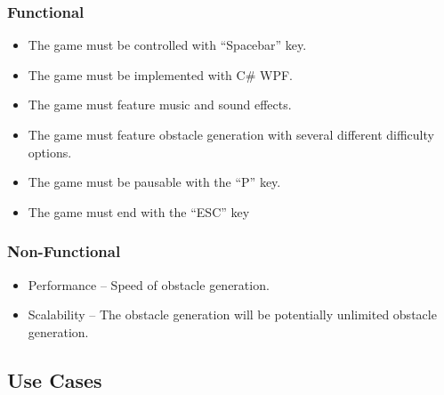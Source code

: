 \documentclass[10pt,conference,onecolumn,compsoc]{IEEEtran}
\begin{document}
\subsubsection{Functional}
	\begin{itemize}
	\item The game must be controlled with ``Spacebar'' key.
	\item The game must be implemented with C\# WPF.
	\item The game must feature music and sound effects.
	\item The game must feature obstacle generation with several different difficulty options.
	\item The game must be pausable with the ``P'' key.
	\item The game must end with the ``ESC'' key
	\end{itemize}

\subsubsection{Non-Functional}
	\begin{itemize}
	\item Performance -- Speed of obstacle generation.
	\item Scalability -- The obstacle generation will be potentially unlimited obstacle generation.
	\end{itemize}

\subsection{Use Cases}
\end{document}
